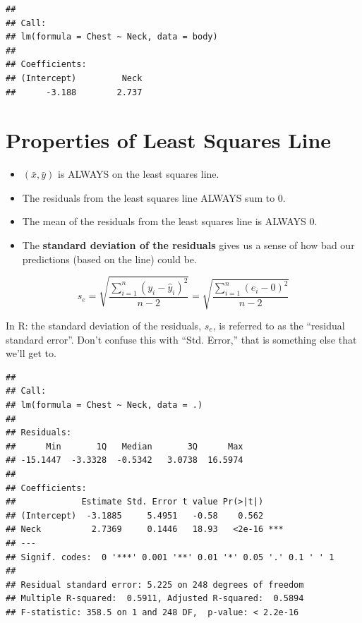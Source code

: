 \documentclass[]{book}
\newenvironment{Shaded}{\begin{snugshade}}{\end{snugshade}}
\newcommand{\CommentTok}[1]{\textcolor[rgb]{0.56,0.35,0.01}{\textit{#1}}}
\newcommand{\DataTypeTok}[1]{\textcolor[rgb]{0.13,0.29,0.53}{#1}}
\newcommand{\KeywordTok}[1]{\textcolor[rgb]{0.13,0.29,0.53}{\textbf{#1}}}
\newcommand{\NormalTok}[1]{#1}
\newcommand{\OperatorTok}[1]{\textcolor[rgb]{0.81,0.36,0.00}{\textbf{#1}}}
\newcommand{\StringTok}[1]{\textcolor[rgb]{0.31,0.60,0.02}{#1}}
\begin{document}
\begin{verbatim}
## 
## Call:
## lm(formula = Chest ~ Neck, data = body)
## 
## Coefficients:
## (Intercept)         Neck  
##      -3.188        2.737
\end{verbatim}

\hypertarget{properties-of-least-squares-line}{%
\section{Properties of Least Squares Line}\label{properties-of-least-squares-line}}

\begin{itemize}
\item
  \((\bar{x},\bar{y})\) is ALWAYS on the least squares line.
\item
  The residuals from the least squares line ALWAYS sum to 0.
\item
  The mean of the residuals from the least squares line is ALWAYS 0.
\item
  The \textbf{standard deviation of the residuals} gives us a sense of how bad our predictions (based on the line) could be.
\end{itemize}

\[s_e = \sqrt{\frac{\sum^n_{i=1} (y_i-\hat{y}_i)^2}{n-2}}  = \sqrt{\frac{\sum^n_{i=1} (e_i-0)^2}{n-2}} \]

In R: the standard deviation of the residuals, \(s_e\), is referred to as the ``residual standard error''. Don't confuse this with ``Std. Error,'' that is something else that we'll get to.

\begin{Shaded}
\end{Shaded}

\begin{verbatim}
## 
## Call:
## lm(formula = Chest ~ Neck, data = .)
## 
## Residuals:
##      Min       1Q   Median       3Q      Max 
## -15.1447  -3.3328  -0.5342   3.0738  16.5974 
## 
## Coefficients:
##             Estimate Std. Error t value Pr(>|t|)    
## (Intercept)  -3.1885     5.4951   -0.58    0.562    
## Neck          2.7369     0.1446   18.93   <2e-16 ***
## ---
## Signif. codes:  0 '***' 0.001 '**' 0.01 '*' 0.05 '.' 0.1 ' ' 1
## 
## Residual standard error: 5.225 on 248 degrees of freedom
## Multiple R-squared:  0.5911, Adjusted R-squared:  0.5894 
## F-statistic: 358.5 on 1 and 248 DF,  p-value: < 2.2e-16
\end{verbatim}
\end{document}
